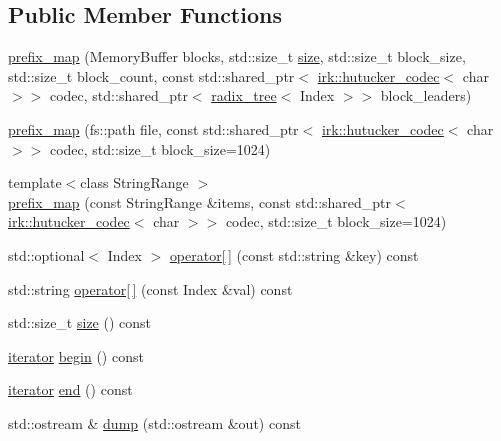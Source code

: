 \subsection*{Public Member Functions}
\begin{DoxyCompactItemize}
\item 
\mbox{\hyperlink{classirk_1_1prefix__map_a0460c33c17f3182b9db49b45bc366069}{prefix\+\_\+map}} (Memory\+Buffer blocks, std\+::size\+\_\+t \mbox{\hyperlink{classirk_1_1prefix__map_ad9055b6d6717495d9b61aa1865bd9a49}{size}}, std\+::size\+\_\+t block\+\_\+size, std\+::size\+\_\+t block\+\_\+count, const std\+::shared\+\_\+ptr$<$ \mbox{\hyperlink{classirk_1_1hutucker__codec}{irk\+::hutucker\+\_\+codec}}$<$ char $>$$>$ codec, std\+::shared\+\_\+ptr$<$ \mbox{\hyperlink{classirk_1_1radix__tree}{radix\+\_\+tree}}$<$ Index $>$$>$ block\+\_\+leaders)
\item 
\mbox{\hyperlink{classirk_1_1prefix__map_a7a92eedd3b88338fe84a5980201faf87}{prefix\+\_\+map}} (fs\+::path file, const std\+::shared\+\_\+ptr$<$ \mbox{\hyperlink{classirk_1_1hutucker__codec}{irk\+::hutucker\+\_\+codec}}$<$ char $>$$>$ codec, std\+::size\+\_\+t block\+\_\+size=1024)
\item 
{\footnotesize template$<$class String\+Range $>$ }\\\mbox{\hyperlink{classirk_1_1prefix__map_a703e139a8c4453383c8f6ec596ef18f0}{prefix\+\_\+map}} (const String\+Range \&items, const std\+::shared\+\_\+ptr$<$ \mbox{\hyperlink{classirk_1_1hutucker__codec}{irk\+::hutucker\+\_\+codec}}$<$ char $>$$>$ codec, std\+::size\+\_\+t block\+\_\+size=1024)
\item 
std\+::optional$<$ Index $>$ \mbox{\hyperlink{classirk_1_1prefix__map_af8c0c9c8a7bc1b31d03111e714aaec2b}{operator\mbox{[}$\,$\mbox{]}}} (const std\+::string \&key) const
\item 
std\+::string \mbox{\hyperlink{classirk_1_1prefix__map_a403d1389dab40173b52d5faa82b6aff6}{operator\mbox{[}$\,$\mbox{]}}} (const Index \&val) const
\item 
std\+::size\+\_\+t \mbox{\hyperlink{classirk_1_1prefix__map_ad9055b6d6717495d9b61aa1865bd9a49}{size}} () const
\item 
\mbox{\hyperlink{classirk_1_1prefix__map_1_1iterator}{iterator}} \mbox{\hyperlink{classirk_1_1prefix__map_a865e7acbf722c38d76287d4b47cf3e38}{begin}} () const
\item 
\mbox{\hyperlink{classirk_1_1prefix__map_1_1iterator}{iterator}} \mbox{\hyperlink{classirk_1_1prefix__map_a2e4677738f2a2a9eb6593e767d2d6a9e}{end}} () const
\item 
std\+::ostream \& \mbox{\hyperlink{classirk_1_1prefix__map_a169d893870da9dbb102a9f000ef32d3c}{dump}} (std\+::ostream \&out) const
\end{DoxyCompactItemize}


